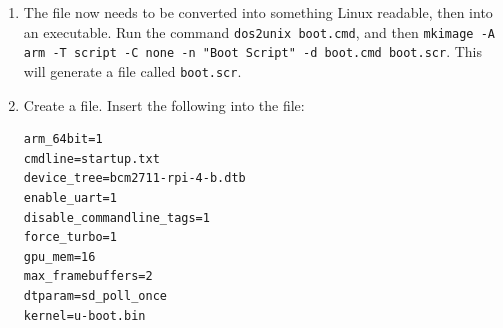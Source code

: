 \documentclass[12pt]{article}
\begin{document}
\begin{enumerate}
\begin{verbatim}
    # Specify that the boot image failed
    else
        echo "Boot failed for both primary and backup images"
    fi
fi
    \end{verbatim}
    Here is a quick rundown of what this does:
    \begin{itemize}
        \item The first thing the script does set the device tree address.
        \item The script then loads your image into memory and checks if it was successful. If it was, the image is booted.
        \item If no image was found or it was not loaded correctly, the script tries to find and load a backup image into memory. If this is successful, the script boots the backup image.
    \end{itemize}
    \item The file now needs to be converted into something Linux readable, then into an executable. Run the command \texttt{dos2unix boot.cmd}, and then \texttt{mkimage -A arm -T script -C none -n "Boot Script" -d boot.cmd boot.scr}. This will generate a file called \texttt{boot.scr}.
    \item Create a  file. Insert the following into the file:
    \begin{verbatim}
arm_64bit=1
cmdline=startup.txt
device_tree=bcm2711-rpi-4-b.dtb
enable_uart=1
disable_commandline_tags=1
force_turbo=1
gpu_mem=16
max_framebuffers=2
dtparam=sd_poll_once
kernel=u-boot.bin
    \end{verbatim}
\end{enumerate}
\end{document}
